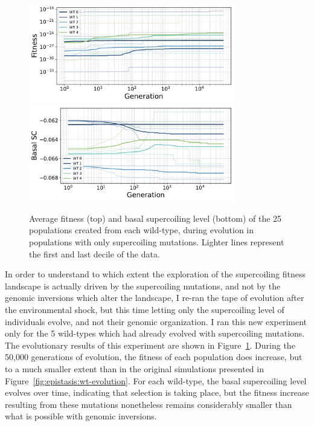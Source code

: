 \begin{figure}[H]
\centering
\includegraphics[width=0.8\textwidth]{epistasis/img/sc-only/fitness_per_wt.pdf}
\includegraphics[width=0.8\textwidth]{epistasis/img/sc-only/sc_per_wt.pdf}
\caption[Average basal supercoiling and fitness during evolution with only basal supercoiling level mutations]{Average fitness (top) and basal supercoiling level (bottom) of the 25 populations created from each wild-type, during evolution in populations with only supercoiling mutations.
Lighter lines represent the first and last decile of the data.}
\label{fig:epistasis:sc-only-evolution}
\end{figure}

In order to understand to which extent the exploration of the supercoiling fitness landscape is actually driven by the supercoiling mutations, and not by the genomic inversions which alter the landscape, I re-ran the tape of evolution after the environmental shock, but this time letting only the supercoiling level of individuals evolve, and not their genomic organization.
I ran this new experiment only for the 5 wild-types which had already evolved with supercoiling mutations.
The evolutionary results of this experiment are shown in Figure~\ref{fig:epistasis:sc-only-evolution}.
During the 50,000 generations of evolution, the fitness of each population does increase, but to a much smaller extent than in the original simulations presented in Figure~\ref{fig:epistasis:wt-evolution}.
For each wild-type, the basal supercoiling level evolves over time, indicating that selection is taking place, but the fitness increase resulting from these mutations nonetheless remains considerably smaller than what is possible with genomic inversions.

